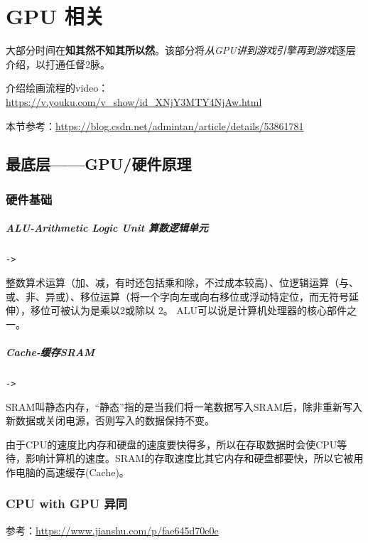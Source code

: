 \documentclass[UTF8,a4paper,12pt]{ctexbook}
\begin{document}
\chapter{GPU 相关}
	大部分时间在\textbf{知其然不知其所以然}。该部分将\textit{从GPU讲到游戏引擎再到游戏}逐层介绍，以打通任督2脉。 

	介绍绘画流程的video：\url{https://v.youku.com/v_show/id_XNjY3MTY4NjAw.html}
	
	本节参考：\url{https://blog.csdn.net/admintan/article/details/53861781}
	\section{最底层——GPU/硬件原理}
		
		\subsection{硬件基础}
			\paragraph{ALU-Arithmetic Logic Unit 算数逻辑单元}\verb|->|
			
				整数算术运算（加、减，有时还包括乘和除，不过成本较高）、位逻辑运算（与、或、非、异或）、移位运算（将一个字向左或向右移位或浮动特定位，而无符号延伸），移位可被认为是乘以2或除以 2。 ALU可以说是计算机处理器的核心部件之一。

			\paragraph{Cache-缓存SRAM}\verb|->|
			
				SRAM叫静态内存，“静态”指的是当我们将一笔数据写入SRAM后，除非重新写入新数据或关闭电源，否则写入的数据保持不变。 
				
				由于CPU的速度比内存和硬盘的速度要快得多，所以在存取数据时会使CPU等待，影响计算机的速度。SRAM的存取速度比其它内存和硬盘都要快，所以它被用作电脑的高速缓存(Cache)。
		\subsection{CPU with GPU 异同}
		
			参考：\url{https://www.jianshu.com/p/fae645d70e0e}
		
\end{document}

